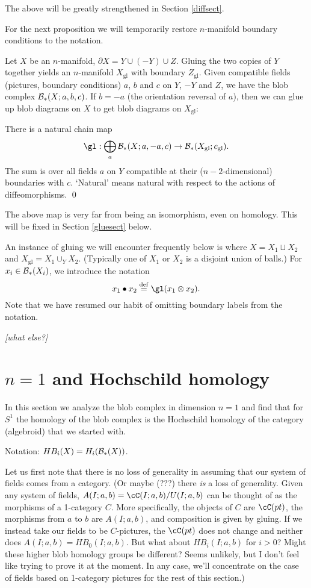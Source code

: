 \documentclass[11pt,leqno]{article}
\def\bc{{\cal B}}
\def\du{\sqcup}
\def\bd{\partial}
\def\sgl{_\mathrm{gl}}
\def\deq{\stackrel{\mathrm{def}}{=}}
\def\nn#1{{{\it \small [#1]}}}
\newcommand{\eq}[1]{\begin{displaymath}#1\end{displaymath}}
\begin{document}
The above will be greatly strengthened in Section \ref{diffsect}.

\medskip

For the next proposition we will temporarily restore $n$-manifold boundary
conditions to the notation.

Let $X$ be an $n$-manifold, $\bd X = Y \cup (-Y) \cup Z$.
Gluing the two copies of $Y$ together yields an $n$-manifold $X\sgl$
with boundary $Z\sgl$.
Given compatible fields (pictures, boundary conditions) $a$, $b$ and $c$ on $Y$, $-Y$ and $Z$,
we have the blob complex $\bc_*(X; a, b, c)$.
If $b = -a$ (the orientation reversal of $a$), then we can glue up blob diagrams on
$X$ to get blob diagrams on $X\sgl$:

\begin{prop}
There is a natural chain map
\eq{
	\gl: \bigoplus_a \bc_*(X; a, -a, c) \to \bc_*(X\sgl; c\sgl).
}
The sum is over all fields $a$ on $Y$ compatible at their 
($n{-}2$-dimensional) boundaries with $c$.
`Natural' means natural with respect to the actions of diffeomorphisms.
\qed
\end{prop}

The above map is very far from being an isomorphism, even on homology.
This will be fixed in Section \ref{gluesect} below.

An instance of gluing we will encounter frequently below is where $X = X_1 \du X_2$
and $X\sgl = X_1 \cup_Y X_2$.
(Typically one of $X_1$ or $X_2$ is a disjoint union of balls.)
For $x_i \in \bc_*(X_i)$, we introduce the notation
\eq{
	x_1 \bullet x_2 \deq \gl(x_1 \otimes x_2) .
}
Note that we have resumed our habit of omitting boundary labels from the notation.


\bigskip

\nn{what else?}




\section{$n=1$ and Hochschild homology}

In this section we analyze the blob complex in dimension $n=1$
and find that for $S^1$ the homology of the blob complex is the 
Hochschild homology of the category (algebroid) that we started with.

Notation: $HB_i(X) = H_i(\bc_*(X))$.

Let us first note that there is no loss of generality in assuming that our system of 
fields comes from a category.
(Or maybe (???) there {\it is} a loss of generality.
Given any system of fields, $A(I; a, b) = \cC(I; a, b)/U(I; a, b)$ can be 
thought of as the morphisms of a 1-category $C$.
More specifically, the objects of $C$ are $\cC(pt)$, the morphisms from $a$ to $b$
are $A(I; a, b)$, and composition is given by gluing.
If we instead take our fields to be $C$-pictures, the $\cC(pt)$ does not change
and neither does $A(I; a, b) = HB_0(I; a, b)$.
But what about $HB_i(I; a, b)$ for $i > 0$?
Might these higher blob homology groups be different?
Seems unlikely, but I don't feel like trying to prove it at the moment.
In any case, we'll concentrate on the case of fields based on 1-category
pictures for the rest of this section.)
\end{document}
